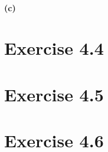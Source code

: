 \documentclass[11pt, letterpaper]{article}
\begin{document}
\paragraph{(c)}



\section{Exercise 4.4}
\section{Exercise 4.5}
\section{Exercise 4.6}
\end{document}
